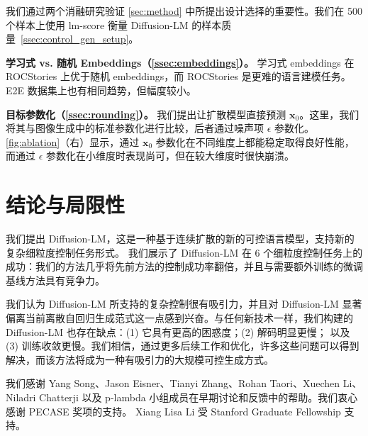 \documentclass{article}
\newcommand{\cx}[1]{\mathbf{x}_{#1}}
\begin{document}
我们通过两个消融研究验证 \cref{sec:method} 中所提出设计选择的重要性。我们在 500 个样本上使用 lm-score 衡量 Diffusion-LM 的样本质量~\cref{ssec:control_gen_setup}。

\textbf{学习式 vs. 随机 Embeddings（\cref{ssec:embeddings}）。}
学习式 embeddings 在 ROCStories 上优于随机 embeddings，而 ROCStories 是更难的语言建模任务。E2E 数据集上也有相同趋势，但幅度较小。


\textbf{目标参数化（\cref{ssec:rounding}）。}
我们提出让扩散模型直接预测 $\cx{0}$。这里，我们将其与图像生成中的标准参数化进行比较，后者通过噪声项 $\epsilon$ 参数化。\cref{fig:ablation}（右）显示，通过 $\cx{0}$ 参数化在不同维度上都能稳定取得良好性能，而通过 $\epsilon$ 参数化在小维度时表现尚可，但在较大维度时很快崩溃。




\section{结论与局限性}
我们提出 Diffusion-LM，这是一种基于连续扩散的新的可控语言模型，支持新的复杂细粒度控制任务形式。
我们展示了 Diffusion-LM 在 6 个细粒度控制任务上的成功：我们的方法几乎将先前方法的控制成功率翻倍，并且与需要额外训练的微调基线方法具有竞争力。

我们认为 Diffusion-LM 所支持的复杂控制很有吸引力，并且对 Diffusion-LM 显著偏离当前离散自回归生成范式这一点感到兴奋。与任何新技术一样，我们构建的 Diffusion-LM 也存在缺点：(1) 它具有更高的困惑度；(2) 解码明显更慢；%
以及 (3) 训练收敛更慢。我们相信，通过更多后续工作和优化，许多这些问题可以得到解决，而该方法将成为一种有吸引力的大规模可控生成方式。%



\begin{ack}
我们感谢 Yang Song、Jason Eisner、Tianyi Zhang、Rohan Taori、Xuechen Li、Niladri Chatterji 以及 p-lambda 小组成员在早期讨论和反馈中的帮助。我们衷心感谢 PECASE 奖项的支持。
Xiang Lisa Li 受 Stanford Graduate Fellowship 支持。
\end{ack}







\end{document}
